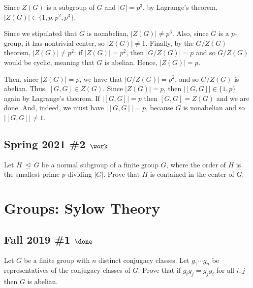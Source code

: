 \begin{solution}

Since \(Z(G)\) is a subgroup of \(G\) and \(|G| = p^3\), by Lagrange's
theorem, \(|Z(G)| \in \{1, p, p^2, p^3\}\).

Since we stipulated that \(G\) is nonabelian, \(|Z(G)| \ne p^3\). Also,
since \(G\) is a \(p\)-group, it has nontrivial center, so
\(|Z(G)| \ne 1\). Finally, by the \(G/Z(G)\) theorem,
\(|Z(G)| \ne p^2\): if \(|Z(G)| = p^2\), then \(|G/Z(G)| = p\) and so
\(G/Z(G)\) would be cyclic, meaning that \(G\) is abelian. Hence,
\(|Z(G)| = p\).

Then, since \(|Z(G)| = p\), we have that \(|G/Z(G)| = p^2\), and so
\(G/Z(G)\) is abelian. Thus, \([G, G] \in Z(G)\). Since \(|Z(G)| = p\),
then \(|[G,G]| \in \{ 1, p\}\) again by Lagrange's theorem. If
\(|[G,G]| = p\) then \([G,G] = Z(G)\) and we are done. And, indeed, we
must have \(|[G,G]| = p\), because \(G\) is nonabelian and so
\(|[G,G]| \ne 1\).

\end{solution}

\hypertarget{spring-2021-2-work}{%
\subsection{\texorpdfstring{Spring 2021 \#2
\(\work\)}{Spring 2021 \#2 \textbackslash work}}\label{spring-2021-2-work}}

Let \(H {~\trianglelefteq~}G\) be a normal subgroup of a finite group
\(G\), where the order of \(H\) is the smallest prime \(p\) dividing
\({\left\lvert {G} \right\rvert}\). Prove that \(H\) is contained in the
center of \(G\).

\hypertarget{groups-sylow-theory}{%
\section{Groups: Sylow Theory}\label{groups-sylow-theory}}

\hypertarget{fall-2019-1-done}{%
\subsection{\texorpdfstring{Fall 2019 \#1
\(\done\)}{Fall 2019 \#1 \textbackslash done}}\label{fall-2019-1-done}}

Let \(G\) be a finite group with \(n\) distinct conjugacy classes. Let
\(g_1 \cdots g_n\) be representatives of the conjugacy classes of \(G\).
Prove that if \(g_i g_j = g_j g_i\) for all \(i, j\) then \(G\) is
abelian.


